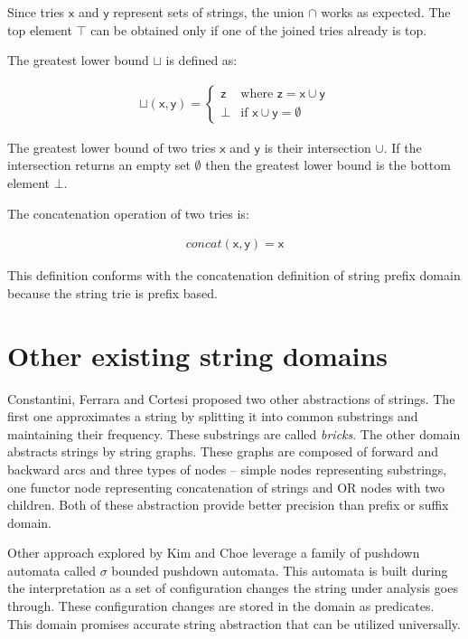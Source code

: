 \documentclass[12pt,final,oneside]{fithesis2}
\theoremstyle{definition}
\begin{document}
Since tries $\mathsf{x}$ and $\mathsf{y}$ represent sets of strings, the union
$\cap$ works as expected. The top element $\top$ can be obtained only if one
of the joined tries already is top.

The greatest lower bound $\sqcup$ is defined as:

\begin{align*}
\sqcup (\mathsf{x}, \mathsf{y}) =
\begin{cases}
\mathsf{z} & \text{where } \mathsf{z} = \mathsf{x} \cup \mathsf{y} \\
\bot       & \text{if } \mathsf{x} \cup \mathsf{y} = \emptyset
\end{cases}
\end{align*}

The greatest lower bound of two tries $\mathsf{x}$ and $\mathsf{y}$ is their
intersection $\cup$. If the intersection returns an empty set $\emptyset$ then
the greatest lower bound is the bottom element $\bot$.

The concatenation operation of two tries is:

\begin{align*}
\textit{concat}(\mathsf{x}, \mathsf{y}) = \mathsf{x}
\end{align*}

This definition conforms with the concatenation definition of string prefix
domain because the string trie is prefix based.


\section{Other existing string domains}
\label{sec:otherstringdomains}

Constantini, Ferrara and Cortesi \cite{Constantini11-1} proposed two other
abstractions of strings. The first one approximates a string by splitting
it into common substrings and maintaining their frequency. These substrings
are called \textit{bricks}. The other domain abstracts strings by string graphs.
These graphs are composed of forward and backward arcs and three types of
nodes -- simple nodes representing substrings, one functor node representing
concatenation of strings and OR nodes with two children. Both of these
abstraction provide better precision than prefix or suffix domain.

Other approach explored by Kim and Choe \cite{KimChoe11-1} leverage a family
of pushdown automata called $\sigma$ bounded pushdown automata. This automata
is built during the interpretation as a set of configuration changes the string
under analysis goes through. These configuration changes are stored in the
domain as predicates. This domain promises accurate string abstraction that
can be utilized universally.
\end{document}
